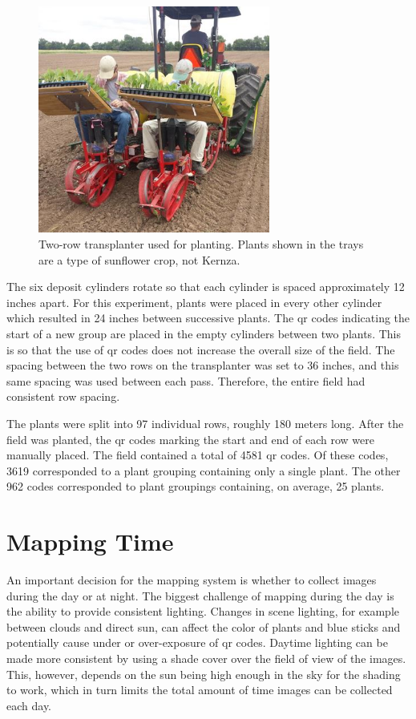 \begin{figure}
	\centering
    \includegraphics[width=3in]{figures/transplanter.jpg}
    \caption[Transplanter]{Two-row transplanter used for planting. Plants shown in the trays are a type of sunflower crop, not Kernza.}
    \label{figure:transplanter}
\end{figure}  

The six deposit cylinders rotate so that each cylinder is spaced approximately 12 inches apart. For this experiment, plants were placed in every other cylinder which resulted in 24 inches between successive plants.  The \ac{qr} codes indicating the start of a new group are placed in the empty cylinders between two plants.  This is so that the use of \ac{qr} codes does not increase the overall size of the field. The spacing between the two rows on the transplanter was set to 36 inches, and this same spacing was used between each pass.  Therefore, the entire field had consistent row spacing. 

The plants were split into 97 individual rows, roughly 180 meters long.  After the field was planted, the \ac{qr} codes marking the start and end of each row were manually placed.  The field contained a total of 4581 \ac{qr} codes.  Of these codes, 3619 corresponded to a plant grouping containing only a single plant.  The other 962 codes corresponded to plant groupings containing, on average, 25 plants.  

\section{Mapping Time}

An important decision for the mapping system is whether to collect images during the day or at night.  The biggest challenge of mapping during the day is the ability to provide consistent lighting.  Changes in scene lighting, for example between clouds and direct sun, can affect the color of plants and blue sticks and potentially cause under or over-exposure of \ac{qr} codes.  Daytime lighting can be made more consistent by using a shade cover over the field of view of the images.  This, however, depends on the sun being high enough in the sky for the shading to work, which in turn limits the total amount of time images can be collected each day.  

